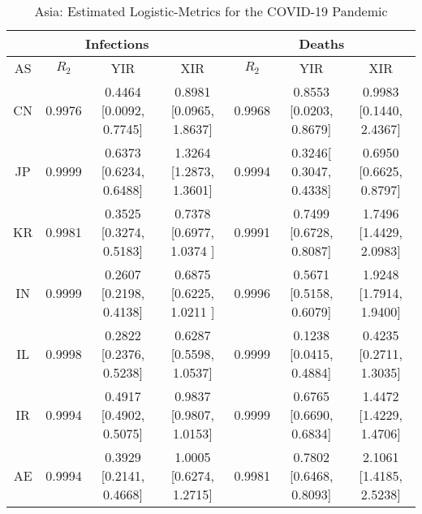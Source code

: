 \documentclass[journal]{IEEEtran}
\theoremstyle{plain}
\theoremstyle{definition}
\theoremstyle{remark}
\begin{document}
\begin{table*}[t]
	\caption{Asia: Estimated Logistic-Metrics for the COVID-19 Pandemic}
	\centering
	\def\arraystretch{1.5}\begin{tabular}{|c|c|c|c|c|c|c|}
	\hline
	\multicolumn{4}{|c||}{Infections}&
	\multicolumn{3}{c|}{Deaths}\\
	\hline\hline
	AS & $R_2$ & YIR & XIR & $R_2$ & YIR & XIR \\
	\hline\hline
	CN&  0.9976&  0.4464 [0.0092,	0.7745]
	&  0.8981	[0.0965,	1.8637]& 0.9968	
	 & 0.8553	[0.0203, 0.8679] &  0.9983	[0.1440, 2.4367] \\
	\hline
	JP&  0.9999&  0.6373 [0.6234,	0.6488]&  1.3264 [1.2873,	1.3601]	& 0.9994 & 	0.3246[	0.3047,	0.4338] & 0.6950 [0.6625, 0.8797] \\
	\hline
	KR&  0.9981& 	0.3525	[0.3274,	0.5183]
	&  0.7378	[0.6977, 1.0374 ]&  0.9991
	&  	0.7499	[0.6728, 0.8087]&  1.7496 [1.4429, 2.0983]\\
	\hline
	IN&  0.9999& 	0.2607	[0.2198,	0.4138]
	&  0.6875	[0.6225, 1.0211 ]&  0.9996
	& 0.5671 [0.5158, 0.6079] & 1.9248	[1.7914,	1.9400]	 \\
	\hline
	IL&  0.9998&	0.2822	[0.2376,	0.5238]
	 &  0.6287	[0.5598,	1.0537] &  0.9999 & 0.1238	[0.0415, 0.4884]  &  0.4235	[0.2711, 1.3035]\\
	\hline
	IR&  0.9994&  0.4917	[0.4902,	0.5075]& 0.9837	[0.9807,	1.0153]
	 & 0.9999& 0.6765	[0.6690, 0.6834] & 	1.4472	[1.4229, 1.4706] \\
	\hline
	AE&  0.9994&  	0.3929	[0.2141,	0.4668]&  1.0005 [0.6274,	1.2715]
	&  0.9981 &  0.7802	[0.6468, 0.8093]& 2.1061	[1.4185, 2.5238]	 \\
	\hline
\end{tabular}
\label{table_asia}
\end{table*}
\end{document}
